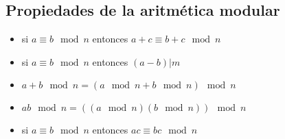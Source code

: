 \subsection{Propiedades de la aritmética modular}
\begin{itemize}
\item si $a\equiv b \mod{n}$ entonces $a+c\equiv b+c \mod{n}$
\item si $a\equiv b \mod{n}$ entonces $(a-b) | m$
\item $a+b \mod{n} = (a\mod{n}+b\mod{n}) \mod{n}$
\item $ab \mod{n} = ((a\mod{n}) (b\mod{n})) \mod{n}$
\item si $a\equiv b \mod{n}$ entonces $ac\equiv bc \mod{n}$
\end{itemize}

